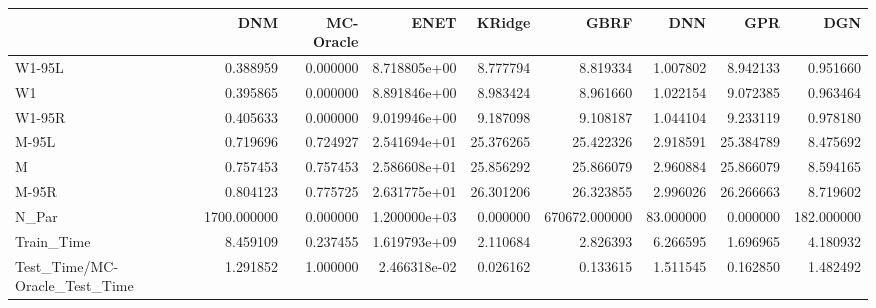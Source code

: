 \begin{tabular}{lrrrrrrrr}
\toprule
{} &          DNM &  MC-Oracle &          ENET &     KRidge &           GBRF &        DNN &        GPR &         DGN \\
\midrule
W1-95L                        &     0.388959 &   0.000000 &  8.718805e+00 &   8.777794 &       8.819334 &   1.007802 &   8.942133 &    0.951660 \\
W1                            &     0.395865 &   0.000000 &  8.891846e+00 &   8.983424 &       8.961660 &   1.022154 &   9.072385 &    0.963464 \\
W1-95R                        &     0.405633 &   0.000000 &  9.019946e+00 &   9.187098 &       9.108187 &   1.044104 &   9.233119 &    0.978180 \\
M-95L                         &     0.719696 &   0.724927 &  2.541694e+01 &  25.376265 &      25.422326 &   2.918591 &  25.384789 &    8.475692 \\
M                             &     0.757453 &   0.757453 &  2.586608e+01 &  25.856292 &      25.866079 &   2.960884 &  25.866079 &    8.594165 \\
M-95R                         &     0.804123 &   0.775725 &  2.631775e+01 &  26.301206 &      26.323855 &   2.996026 &  26.266663 &    8.719602 \\
N\_Par                         &  1700.000000 &   0.000000 &  1.200000e+03 &   0.000000 &  670672.000000 &  83.000000 &   0.000000 &  182.000000 \\
Train\_Time                    &     8.459109 &   0.237455 &  1.619793e+09 &   2.110684 &       2.826393 &   6.266595 &   1.696965 &    4.180932 \\
Test\_Time/MC-Oracle\_Test\_Time &     1.291852 &   1.000000 &  2.466318e-02 &   0.026162 &       0.133615 &   1.511545 &   0.162850 &    1.482492 \\
\bottomrule
\end{tabular}
